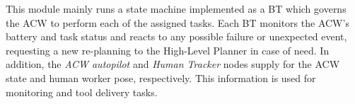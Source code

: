 This module mainly runs a state machine implemented as a \gls{BT} which governs the \gls{ACW} to perform each of the assigned tasks. Each \gls{BT} monitors the \gls{ACW}'s battery and task status and reacts to any possible failure or unexpected event, requesting a new re-planning to the High-Level Planner in case of need. In addition, the \textit{ACW autopilot} and \textit{Human Tracker} nodes supply for the ACW state and human worker pose, respectively. This information is used for monitoring and tool delivery tasks.  


